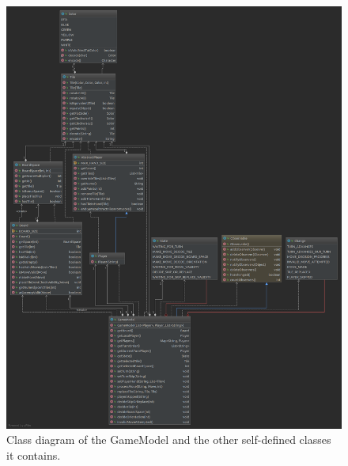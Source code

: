 \documentclass[12pt, letterpaper]{article}
\begin{document}
    \begin{figure}[t]
        \begin{center}
            \includegraphics[width=\textwidth]{GameModel.png}
            \caption{Class diagram of the GameModel and the other self-defined classes it contains.}
            \label{fig:modelDiagram}
        \end{center}
    \end{figure}
\end{document}
